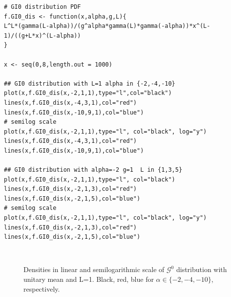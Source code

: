 \documentclass[conference,onecolumn]{IEEEtran}
\begin{document}
\begin{lstlisting}[caption={$\mathcal{G}^0$ distribution}]
# GI0 distribution PDF
f.GI0_dis <- function(x,alpha,g,L){
L^L*(gamma(L-alpha))/(g^alpha*gamma(L)*gamma(-alpha))*x^(L-1)/((g+L*x)^(L-alpha))
}

x <- seq(0,8,length.out = 1000)

## GI0 distribution with L=1 alpha in {-2,-4,-10}
plot(x,f.GI0_dis(x,-2,1,1),type="l",col="black")
lines(x,f.GI0_dis(x,-4,3,1),col="red")
lines(x,f.GI0_dis(x,-10,9,1),col="blue")
# semilog scale
plot(x,f.GI0_dis(x,-2,1,1),type="l", col="black", log="y")
lines(x,f.GI0_dis(x,-4,3,1),col="red")
lines(x,f.GI0_dis(x,-10,9,1),col="blue")

## GI0 distribution with alpha=-2 g=1  L in {1,3,5}
plot(x,f.GI0_dis(x,-2,1,1),type="l", col="black")
lines(x,f.GI0_dis(x,-2,1,3),col="red")
lines(x,f.GI0_dis(x,-2,1,5),col="blue")
# semilog scale
plot(x,f.GI0_dis(x,-2,1,1),type="l", col="black", log="y")
lines(x,f.GI0_dis(x,-2,1,3),col="red")
lines(x,f.GI0_dis(x,-2,1,5),col="blue")

\end{lstlisting}

\begin{figure}[htb]
	\centering
	\ 
	\ 
	\caption{Densities in linear and semilogarithmic scale of $\mathcal{G}^0$ distribution with unitary mean and L=1. Black, red, blue for $\alpha\in\{-2,-4,-10\}$, respectively.}
	\label{Fig:G_dis_alpha}
\end{figure}
\end{document}
